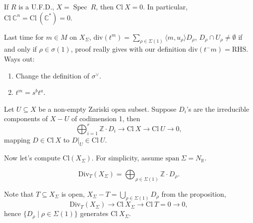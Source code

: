 \documentclass[a4paper,12pt]{amsart}
\newcommand{\ZZ}{\mathbb{Z}}
\newcommand{\RR}{\mathbb{R}}
\newcommand{\CC}{\mathbb{C}}
\DeclareMathOperator{\Spec}{Spec}
\begin{document}
\begin{Fact}
	If $R$ is a U.F.D., $X=\Spec~R$, then $\mathrm{Cl}~X=0$. In particular, $\mathrm{Cl}~\CC^n=\mathrm{Cl}~(\CC^*)=0$.
\end{Fact}

Last time for $m\in M$ on $X_\Sigma$, $\mathrm{div}(t^m)=\sum_{\rho\in\Sigma(1)}\langle m,u_\rho\rangle D_\rho$, $D_\rho\cap U_\rho\neq\emptyset$ if and only if $\rho\in\sigma(1)$, proof really gives with our definition $\mathrm{div}(t^-m)=\mathrm{RHS}$. Ways out:
\begin{enumerate}
	\item Change the definition of $\sigma^\vee$.
	\item $t^m=s^bt^a$.
	\begin{center}
	\end{center}
\end{enumerate}

\begin{proposition}
	Let $U\subseteq X$ be a non-empty Zariski open subset. Suppose $D_i$'s are the irreducible components of $X-U$ of codimension 1, then
	\begin{displaymath}
	\bigoplus_{i=1}^r\ZZ\cdot D_i\to\mathrm{Cl}~X\to\mathrm{Cl}~U\to0,
	\end{displaymath}
	mapping $D\in\mathrm{Cl}~X$ to $D|_U\in\mathrm{Cl}~U$.
\end{proposition}

Now let's compute $\mathrm{Cl}(X_\Sigma)$. For simplicity, assume $\mathrm{span}~\Sigma=N_\RR$.

\begin{Def}
	\begin{displaymath}
	\mathrm{Div}_T(X_\Sigma)=\bigoplus_{\rho\in\Sigma(1)}\ZZ\cdot D_\rho.
	\end{displaymath}
\end{Def}

Note that $T\subseteq X_\Sigma$ is open, $X_\Sigma-T=\bigcup_{\rho\in\Sigma(1)}D_\rho$ from the proposition,
\begin{displaymath}
\mathrm{Div}_T(X_\Sigma)\to\mathrm{Cl}~X_\Sigma\to\mathrm{Cl}~T=0\to0,
\end{displaymath}
hence $\{D_\rho\mid\rho\in\Sigma(1)\}$ generates $\mathrm{Cl}~X_\Sigma$.
\end{document}
